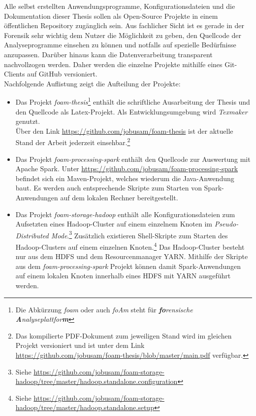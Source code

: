 \noindent
Alle selbst erstellten Anwendungsprogramme, Konfigurationsdateien und die Dokumentation dieser Thesis sollen als Open-Source Projekte in einem öffentlichen Repository zugänglich sein. Aus fachlicher Sicht ist es gerade in der Forensik sehr wichtig dem Nutzer die Möglichkeit zu geben, den Quellcode der Analyseprogramme einsehen zu können und notfalls auf spezielle Bedürfnisse anzupassen. Darüber hinaus kann die Datenverarbeitung transparent nachvollzogen werden.
Daher werden die einzelne Projekte mithilfe eines Git-Clients auf GitHub versioniert.\\
Nachfolgende Auflistung zeigt die Aufteilung der Projekte:
\begin{itemize}
\item Das Projekt \textit{foam-thesis}\footnote{Die Abkürzung \textit{foam} oder auch \textit{foAm} steht für \textit{\textbf{fo}rensische \textbf{A}nalyseplattfor\textbf{m}}} enthält die schriftliche Ausarbeitung der Thesis und den Quellcode als Latex-Projekt. Als Entwicklungsumgebung wird \textit{Texmaker} genutzt.\\
Über den Link \url{https://github.com/jobusam/foam-thesis} ist der aktuelle Stand der Arbeit jederzeit einsehbar.\footnote{Das kompilierte PDF-Dokument zum jeweiligen Stand wird im gleichen Projekt versioniert und ist unter dem Link \url{https://github.com/jobusam/foam-thesis/blob/master/main.pdf} verfügbar.}

\item Das Projekt \textit{foam-processing-spark} enthält den Quellcode zur Auswertung mit Apache Spark\texttrademark\thinspace. Unter \url{https://github.com/jobusam/foam-processing-spark} befindet sich ein Maven-Projekt, welches wiederum die Java-Anwendung baut. Es werden auch entsprechende Skripte zum Starten von Spark-Anwendungen auf dem lokalen Rechner bereitgestellt. 


\item Das Projekt \textit{foam-storage-hadoop} enthält alle Konfigurationsdateien zum Aufsetzten eines Hadoop-Cluster auf einem einzelnem Knoten im \textit{Pseudo-Distributed Mode}.\footnote{Siehe \url{https://github.com/jobusam/foam-storage-hadoop/tree/master/hadoop.standalone.configuration}} Zusätzlich existieren Shell-Skripte zum Starten des Hadoop-Clusters auf einem einzelnen Knoten.\footnote{Siehe \url{https://github.com/jobusam/foam-storage-hadoop/tree/master/hadoop.standalone.setup}} Das Hadoop-Cluster besteht nur aus dem HDFS und dem Resourcenmanager YARN. Mithilfe der Skripte aus dem \textit{foam-processing-spark} Projekt können damit Spark-Anwendungen auf einem lokalen Knoten innerhalb eines HDFS mit YARN ausgeführt werden.
\end{itemize}

